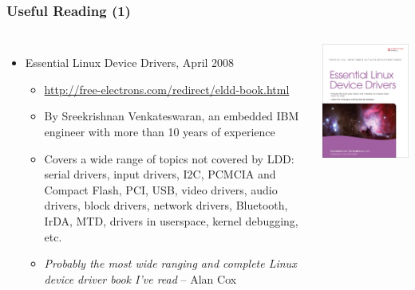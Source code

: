 \begin{frame}
  \frametitle{Useful Reading (1)}
  \begin{columns}
    \begin{itemize}
    \item Essential Linux Device Drivers, April 2008
      \begin{itemize}
      \item \url{http://free-electrons.com/redirect/eldd-book.html}
      \item By Sreekrishnan Venkateswaran, an embedded IBM engineer
        with more than 10 years of experience
      \item Covers a wide range of topics not covered by LDD: serial
        drivers, input drivers, I2C, PCMCIA and Compact Flash, PCI,
        USB, video drivers, audio drivers, block drivers, network
        drivers, Bluetooth, IrDA, MTD, drivers in userspace, kernel
        debugging, etc.
      \item \emph{Probably the most wide ranging and complete Linux
          device driver book I've read} -- Alan Cox
      \end{itemize}
    \end{itemize}
    \includegraphics[width=\textwidth]{slides/kernel-resources-references/eldd.jpg}
  \end{columns}
\end{frame}

